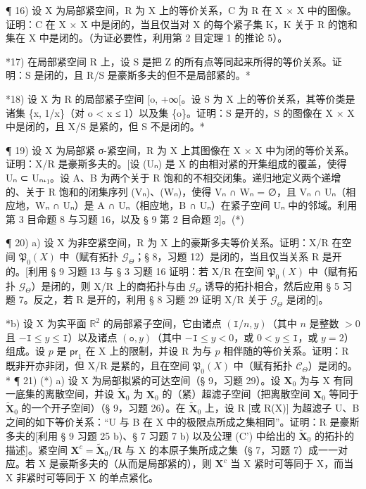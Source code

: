 ¶ 16) 设 X 为局部紧空间，R 为 X 上的等价关系，C 为 R 在 X × X 中的图像。证明：C 在 X × X 中是闭的，当且仅当对 X 的每个紧子集 K，K 关于 R 的饱和集在 X 中是闭的。（为证必要性，利用第 2 目定理 1 的推论 5）。

*17) 在局部紧空间 R 上，设 S 是把 Z 的所有点等同起来所得的等价关系。证明：S 是闭的，且 R/S 是豪斯多夫的但不是局部紧的。*

*18) 设 X 为 R 的局部紧子空间 {[}o, +∞{[}。设 S 为 X 上的等价关系，其等价类是诸集 \{x, 1/x\}（对 o \textless{} x ≤ 1）以及集 \{o\}。证明：S 是开的，S 的图像在 X × X 中是闭的，且 X/S 是紧的，但 S 不是闭的。*

¶ 19) 设 X 为局部紧 σ-紧空间，R 为 X 上其图像在 X × X 中为闭的等价关系。证明：X/R 是豪斯多夫的。{[}设 (Uₙ) 是 X 的由相对紧的开集组成的覆盖，使得 Uₙ ⊂ Uₙ₊₁。设 A、B 为两个关于 R 饱和的不相交闭集。递归地定义两个递增的、关于 R 饱和的闭集序列 (Vₙ)、(Wₙ)，使得 Vₙ ∩ Wₙ = ∅，且 Vₙ ∩ Uₙ（相应地，Wₙ ∩ Uₙ）是 A ∩ Uₙ（相应地，B ∩ Uₙ）在紧子空间 Uₙ 中的邻域。利用第 3 目命题 8 与习题 16，以及 § 9 第 2 目命题 2{]}。(*)

¶ 20) a) 设 X 为非空紧空间，R 为 X 上的豪斯多夫等价关系。证明：X/R 在空间 \(\mathfrak{P}_{0}(X)\) 中（赋有拓扑 \(\mathcal{G}_{\Theta}\)；§ 8，习题 12）是闭的，当且仅当关系 R 是开的。{[}利用 § 9 习题 13 与 § 3 习题 16 证明：若 X/R 在空间 \(\mathfrak{P}_{0}(X)\) 中（赋有拓扑 \(\mathcal{G}_{\Theta}\)）是闭的，则 X/R 上的商拓扑与由 \(\mathcal{G}_{\Theta}\) 诱导的拓扑相合，然后应用 § 5 习题 7。反之，若 R 是开的，利用 § 8 习题 29 证明 X/R 关于 \(\mathcal{G}_{\Theta}\) 是闭的{]}。

*b) 设 X 为实平面 \(\mathbb{R}^2\) 的局部紧子空间，它由诸点 \((\mathtt{I}/n, y)\)（其中 \(n\) 是整数 \(>0\) 且 \(-\mathtt{I} \leqslant y \leqslant \mathtt{I}\)）以及诸点 \((\mathtt{o}, y)\)（其中 \(-\mathtt{I} \leqslant y < 0\)，或 \(0 < y \leqslant \mathtt{I}\)，或 \(y = 2\)）组成。设 \(p\) 是 \(\mathsf{pr}_1\) 在 X 上的限制，并设 R 为与 \(p\) 相伴随的等价关系。证明：R 既非开亦非闭，但 X/R 是紧的，且在空间 \(\mathfrak{P}_0(X)\) 中（赋有拓扑 \(\mathcal{C}_{\Theta}\)）是闭的。* ¶ 21) (*) a) 设 X 为局部拟紧的可达空间（§ 9，习题 29）。设 \(\mathbf{X}_0\) 为与 X 有同一底集的离散空间，并设 \(\tilde{\mathbf{X}}_0\) 为 \(\mathbf{X}_0\) 的（紧）超滤子空间（把离散空间 \(\mathbf{X}_0\) 等同于 \(\tilde{\mathbf{X}}_0\) 的一个开子空间）（§ 9，习题 26）。在 \(\tilde{\mathbf{X}}_0\) 上，设 R {[}或 R(X){]} 为超滤子 U、B 之间的如下等价关系：“U 与 B 在 X 中的极限点所成之集相同”。证明：R 是豪斯多夫的{[}利用 § 9 习题 25 b)、§ 7 习题 7 b) 以及公理 (C') 中给出的 \(\tilde{\mathbf{X}}_0\) 的拓扑的描述{]}。紧空间 \(\mathbf{X}^c = \tilde{\mathbf{X}}_0 / \mathbf{R}\) 与 X 的本原子集所成之集（§ 7，习题 7）成一一对应。若 X 是豪斯多夫的（从而是局部紧的），则 \(\mathbf{X}^c\) 当 X 紧时可等同于 X，而当 X 非紧时可等同于 X 的单点紧化。

